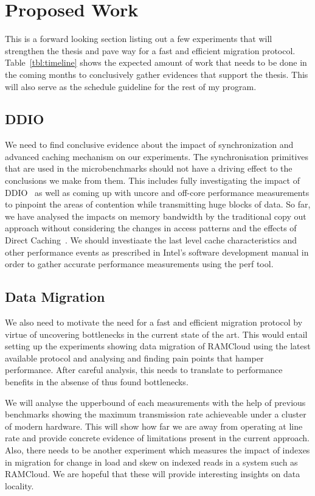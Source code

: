
\chapter{Proposed Work}
\label{chap:proposed-work}
This is a forward looking section listing out a few experiments that will
strengthen the thesis and pave way for a fast and efficient migration protocol.
Table~\ref{tbl:timeline} shows the expected amount of work that needs to be done 
in the coming months to conclusively gather evidences that support the thesis. 
This will also serve as the schedule guideline for the rest of my program.

\section{DDIO}
We need to find conclusive evidence about the impact of synchronization and 
advanced caching mechanism on our experiments. The synchronisation primitives 
that are used in the microbenchmarks should not have a driving effect to the 
conclusions we make from them. This includes fully investigating the impact
of DDIO~\cite{ddio} as well as coming up with uncore and off-core performance
measurements to pinpoint the areas of contention while transmitting huge blocks
of data. So far, we have analysed the impacts on memory bandwidth by the traditional
copy out approach without considering the changes in access patterns and the effects
of Direct Caching~\cite{dca}. We should investiaate the last level cache characteristics 
and other performance events as prescribed in Intel\textregistered 's software development
manual in order to gather accurate performance measurements using the perf tool.

\section{Data Migration}
We also need to motivate the need for a fast and efficient migration protocol 
by virtue of uncovering bottlenecks in the current state of the art. This would entail
setting up the experiments showing data migration of RAMCloud using the latest 
available protocol and analysing and finding pain points that hamper performance.
After careful analysis, this needs to translate to performance benefits in the absense
of thus found bottlenecks. 

We will analyse the upperbound of each measurements with the help
of previous benchmarks showing the maximum transmission rate achieveable under 
a cluster of modern hardware. This will show how far we are away from 
operating at line rate and provide concrete evidence of limitations present in 
the current approach. Also, there needs to be another experiment which measures
the impact of indexes in migration for change in load and skew on indexed reads
in a system such as RAMCloud. We are hopeful that these will provide interesting
insights on data locality.

